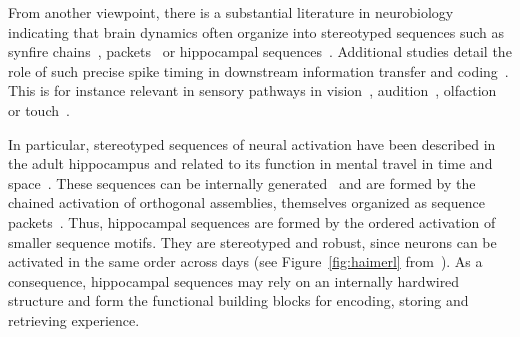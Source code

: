 \documentclass[brainsci, %
               review,submit,pdftex,moreauthors
               ]{Definitions/mdpi}
\begin{document}
From another viewpoint, there is a substantial literature in neurobiology indicating that brain dynamics often organize into stereotyped sequences such as synfire chains~\citep{ikegaya_synfire_2004}, packets~\citep{luczak_sequential_2007} or hippocampal sequences~\citep{pastalkova_internally_2008}. Additional studies detail the role of such precise spike timing in downstream information transfer and coding~\citep{villette_internally_2015,branco_dendritic_2010,luczak_packet-based_2015}. This is for instance relevant in sensory pathways in vision~\citep{meister_concerted_1995}, audition~\citep{decharms_primary_1996}, olfaction~\citep{wehr_odour_1996} or touch~\citep{johansson_first_2004}. 

In particular, stereotyped sequences of neural activation have been described in the adult hippocampus and related to its function in mental travel in time and space~\citep{buzsaki_space_2018}. These sequences can be internally generated~\citep{pastalkova_internally_2008,villette_internally_2015} and are formed by the chained activation of orthogonal assemblies, themselves organized as sequence packets~\citep{malvache_awake_2016}. Thus, hippocampal sequences are formed by the ordered activation of smaller sequence motifs. They are stereotyped and robust, since neurons can be activated in the same order across days (see Figure~\ref{fig:haimerl} from~\citep{haimerl_internal_2019}). As a consequence, hippocampal sequences may rely on an internally hardwired structure and form the functional building blocks for encoding, storing and retrieving experience.
\end{document}

